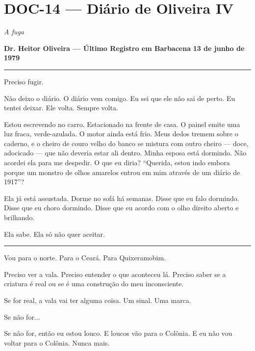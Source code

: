 \section*{\textbf{DOC-14} --- Diário de Oliveira IV}

\noindent \textit{A fuga}

\noindent \textbf{Dr. Heitor Oliveira --- Último Registro em Barbacena}
\textbf{13 de junho de 1979}

\vspace{0.5em}\noindent\rule{\textwidth}{0.5pt}\vspace{0.5em}

\noindent Preciso fugir.

\noindent Não deixo o diário. O diário vem comigo. Eu sei que ele não sai de perto. Eu tentei deixar. Ele volta. Sempre volta.

\noindent Estou escrevendo no carro. Estacionado na frente de casa. O painel emite uma luz fraca, verde-azulada. O motor ainda está frio. Meus dedos tremem sobre o caderno, e o cheiro de couro velho do banco se mistura com outro cheiro --- doce, adocicado --- que não deveria estar ali dentro. Minha esposa está dormindo. Não acordei ela para me despedir. O que eu diria? \textquotedblleft{}Querida, estou indo embora porque um monstro de olhos amarelos entrou em mim através de um diário de 1917\textquotedblright{}?

\noindent Ela já está assustada. Dorme no sofá há semanas. Disse que eu falo dormindo. Disse que eu choro dormindo. Disse que eu acordo com o olho direito aberto e brilhando.

\noindent Ela sabe.
Ela só não quer aceitar.

\vspace{0.5em}\noindent\rule{\textwidth}{0.5pt}\vspace{0.5em}

\noindent Vou para o norte. Para o Ceará. Para Quixeramobim.

\noindent Preciso ver a vala. Preciso entender o que aconteceu lá. Preciso saber se a criatura é real ou se é uma construção do meu inconsciente.

\noindent Se for real, a vala vai ter alguma coisa. Um sinal. Uma marca.

\noindent Se não for...

\noindent Se não for, então eu estou louco. E loucos vão para o Colônia. E eu não vou voltar para o Colônia. Nunca mais.

